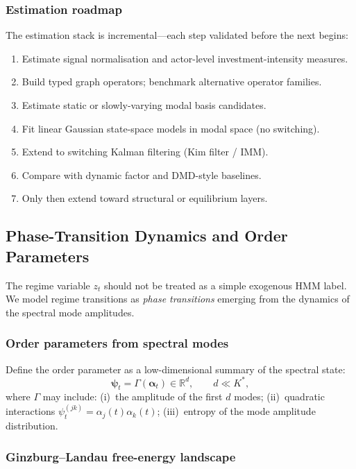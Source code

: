\documentclass[11pt,a4paper]{article}
\theoremstyle{definition}
\newcommand{\R}{\mathbb{R}}
\newcommand{\balpha}{\bm{\alpha}}
\newcommand{\bpsi}{\bm{\psi}}
\begin{document}
\subsubsection{Estimation roadmap}

The estimation stack is incremental---each step validated before the next begins:
\begin{enumerate}[nosep]
  \item Estimate signal normalisation and actor-level investment-intensity measures.
  \item Build typed graph operators; benchmark alternative operator families.
  \item Estimate static or slowly-varying modal basis candidates.
  \item Fit linear Gaussian state-space models in modal space (no switching).
  \item Extend to switching Kalman filtering (Kim filter / IMM).
  \item Compare with dynamic factor and DMD-style baselines.
  \item Only then extend toward structural or equilibrium layers.
\end{enumerate}

\subsection{Phase-Transition Dynamics and Order Parameters}
\label{sec:phase_transition}

The regime variable $z_t$ should not be treated as a simple exogenous HMM label. We model regime transitions as \emph{phase transitions} emerging from the dynamics of the spectral mode amplitudes.

\subsubsection{Order parameters from spectral modes}

Define the order parameter as a low-dimensional summary of the spectral state:
\begin{equation}
  \bpsi_t = \Gamma(\balpha_t) \in \R^d, \qquad d \ll K^*,
  \label{eq:order_param}
\end{equation}
where $\Gamma$ may include: (i)~the amplitude of the first $d$ modes; (ii)~quadratic interactions $\psi_t^{(jk)} = \alpha_j(t)\alpha_k(t)$; (iii)~entropy of the mode amplitude distribution.

\subsubsection{Ginzburg--Landau free-energy landscape}
\end{document}
